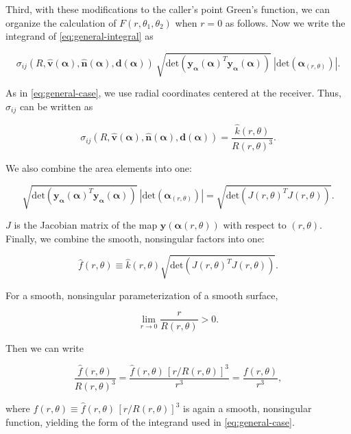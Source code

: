 \documentclass[11pt]{article}
\renewcommand{\vec}[1]{\boldsymbol{#1}}
\newcommand{\uvec}[1]{\hat{\boldsymbol{#1}}}
\begin{document}
Third, with these modifications to the caller's point Green's function,
we can organize the calculation of $F(r,\theta_1,\theta_2)$ when $r = 0$ as follows.
Now we write the integrand of \eqref{eq:general-integral} as
\begin{linenomath}\begin{equation*}
  \sigma_{ij}(R, \uvec{v}(\vec{\alpha}), \uvec{n}(\vec{\alpha}), \vec{d}(\vec{\alpha})) \
  \sqrt{\mathrm{det}(\vec{y}_{\vec{\alpha}}(\vec{\alpha})^T \vec{y}_{\vec{\alpha}}(\vec{\alpha}))} \
  | \mathrm{det}(\vec{\alpha}_{(r,\theta)}) |.
\end{equation*}\end{linenomath}
As in \eqref{eq:general-case}, we use radial coordinates centered at the receiver.
Thus, $\sigma_{ij}$ can be written as
\begin{linenomath}\begin{equation*}
  \sigma_{ij}(R, \uvec{v}(\vec{\alpha}), \uvec{n}(\vec{\alpha}), \vec{d}(\vec{\alpha})) =
  \frac{\hat{k}(r,\theta)}{R(r,\theta)^3}.
\end{equation*}\end{linenomath}
We also combine the area elements into one:
\begin{linenomath}\begin{equation*}
  \sqrt{\mathrm{det}(\vec{y}_{\vec{\alpha}}(\vec{\alpha})^T \vec{y}_{\vec{\alpha}}(\vec{\alpha}))} \
  | \mathrm{det}(\vec{\alpha}_{(r,\theta)}) |
  = \sqrt{\mathrm{det}(J(r,\theta)^T J(r,\theta))}.
\end{equation*}\end{linenomath}
$J$ is the Jacobian matrix of the map $\vec{y}(\vec{\alpha}(r,\theta))$ with respect to $(r,\theta)$.
Finally, we combine the smooth, nonsingular factors into one:
\begin{linenomath}\begin{equation*}
  \hat{f}(r,\theta) \equiv \hat{k}(r,\theta) \sqrt{\mathrm{det}(J(r,\theta)^T J(r,\theta))}.
\end{equation*}\end{linenomath}
For a smooth, nonsingular parameterization of a smooth surface,
\begin{linenomath}\begin{equation*}
  \lim_{r \rightarrow 0} \frac{r}{R(r,\theta)} > 0.
\end{equation*}\end{linenomath}
Then we can write
\begin{linenomath}\begin{equation*}
  \frac{\hat{f}(r,\theta)}{R(r,\theta)^3}
  = \frac{\hat{f}(r,\theta) \, [r/R(r,\theta)]^3}{r^3}
  = \frac{f(r,\theta)}{r^3},
\end{equation*}\end{linenomath}
where $f(r,\theta) \equiv \hat{f}(r,\theta) \, [r/R(r,\theta)]^3$
is again a smooth, nonsingular function,
yielding the form of the integrand used in \eqref{eq:general-case}.
\end{document}
